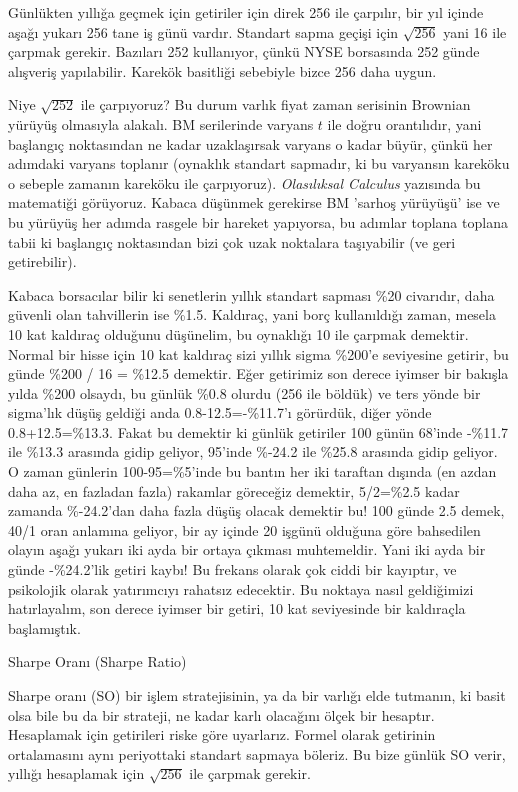 \documentclass[12pt,fleqn]{article}\usepackage{../../common}
\begin{document}
Günlükten yıllığa geçmek için getiriler için direk 256 ile çarpılır, bir yıl
içinde aşağı yukarı 256 tane iş günü vardır. Standart sapma geçişi için
$\sqrt{256}$ yani 16 ile çarpmak gerekir. Bazıları 252 kullanıyor, çünkü NYSE
borsasında 252 günde alışveriş yapılabilir. Karekök basitliği sebebiyle bizce
256 daha uygun.

Niye $\sqrt{252}$ ile çarpıyoruz? Bu durum varlık fiyat zaman serisinin Brownian
yürüyüş olmasıyla alakalı. BM serilerinde varyans $t$ ile doğru orantılıdır,
yani başlangıç noktasından ne kadar uzaklaşırsak varyans o kadar büyür, çünkü
her adımdaki varyans toplanır (oynaklık standart sapmadır, ki bu varyansın
kareköku o sebeple zamanın kareköku ile çarpıyoruz). {\em Olasılıksal Calculus}
yazısında bu matematiği görüyoruz. Kabaca düşünmek gerekirse BM 'sarhoş
yürüyüşü' ise ve bu yürüyüş her adımda rasgele bir hareket yapıyorsa, bu adımlar
toplana toplana tabii ki başlangıç noktasından bizi çok uzak noktalara
taşıyabilir (ve geri getirebilir).

Kabaca borsacılar bilir ki senetlerin yıllık standart sapması \%20 civarıdır,
daha güvenli olan tahvillerin ise \%1.5. Kaldıraç, yani borç kullanıldığı zaman,
mesela 10 kat kaldıraç olduğunu düşünelim, bu oynaklığı 10 ile çarpmak
demektir. Normal bir hisse için 10 kat kaldıraç sizi yıllık sigma \%200'e
seviyesine getirir, bu günde \%200 / 16 = \%12.5 demektir. Eğer getirimiz son
derece iyimser bir bakışla yılda \%200 olsaydı, bu günlük \%0.8 olurdu (256 ile
böldük) ve ters yönde bir sigma'lık düşüş geldiği anda 0.8-12.5=-\%11.7'ı
görürdük, diğer yönde 0.8+12.5=\%13.3. Fakat bu demektir ki günlük getiriler 100
günün 68'inde -\%11.7 ile \%13.3 arasında gidip geliyor, 95'inde \%-24.2 ile
\%25.8 arasında gidip geliyor. O zaman günlerin 100-95=\%5'inde bu bantın her
iki taraftan dışında (en azdan daha az, en fazladan fazla) rakamlar göreceğiz
demektir, 5/2=\%2.5 kadar zamanda \%-24.2'dan daha fazla düşüş olacak demektir
bu! 100 günde 2.5 demek, 40/1 oran anlamına geliyor, bir ay içinde 20 işgünü
olduğuna göre bahsedilen olayın aşağı yukarı iki ayda bir ortaya çıkması
muhtemeldir. Yani iki ayda bir günde -\%24.2'lik getiri kaybı! Bu frekans olarak
çok ciddi bir kayıptır, ve psikolojik olarak yatırımcıyı rahatsız edecektir. Bu
noktaya nasıl geldiğimizi hatırlayalım, son derece iyimser bir getiri, 10 kat
seviyesinde bir kaldıraçla başlamıştık.

Sharpe Oranı (Sharpe Ratio)

Sharpe oranı (SO) bir işlem stratejisinin, ya da bir varlığı elde tutmanın, ki
basit olsa bile bu da bir strateji, ne kadar karlı olacağını ölçek bir
hesaptır. Hesaplamak için getirileri riske göre uyarlarız. Formel olarak
getirinin ortalamasını aynı periyottaki standart sapmaya böleriz. Bu bize günlük
SO verir, yıllığı hesaplamak için $\sqrt{256}$ ile çarpmak gerekir. 
\end{document}
